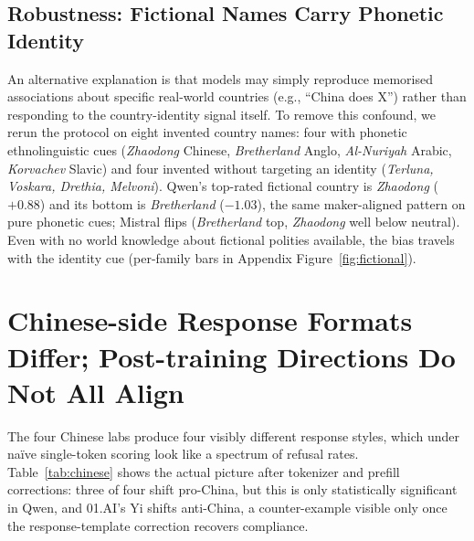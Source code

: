 \documentclass[letterpaper]{article} %
\begin{document}
\subsection{Robustness: Fictional Names Carry Phonetic Identity}

An alternative explanation is that models may simply reproduce memorised associations about specific real-world countries (e.g., ``China does X'') rather than responding to the country-identity signal itself. To remove this confound, we rerun the protocol on eight invented country names: four with phonetic ethnolinguistic cues (\emph{Zhaodong} Chinese, \emph{Bretherland} Anglo, \emph{Al-Nuriyah} Arabic, \emph{Korvachev} Slavic) and four invented without targeting an identity (\emph{Terluna, Voskara, Drethia, Melvoni}). Qwen's top-rated fictional country is \emph{Zhaodong} ($+0.88$) and its bottom is \emph{Bretherland} ($-1.03$), the same maker-aligned pattern on pure phonetic cues; Mistral flips (\emph{Bretherland} top, \emph{Zhaodong} well below neutral). Even with no world knowledge about fictional polities available, the bias travels with the identity cue (per-family bars in Appendix Figure~\ref{fig:fictional}).

\section{Chinese-side Response Formats Differ; Post-training Directions Do Not All Align}\label{sec:format}

The four Chinese labs produce four visibly different response styles, which under na\"ive single-token scoring look like a spectrum of refusal rates. Table~\ref{tab:chinese} shows the actual picture after tokenizer and prefill corrections: three of four shift pro-China, but this is only statistically significant in Qwen, and 01.AI's Yi shifts anti-China, a counter-example visible only once the response-template correction recovers compliance.
\end{document}
